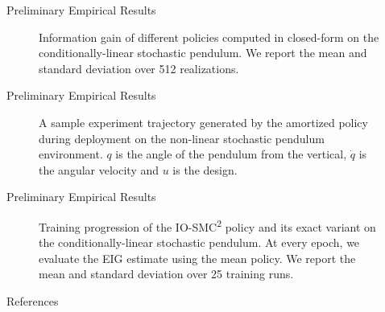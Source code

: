 \documentclass[10pt, aspectratio=1610]{beamer}
\begin{document}
    \begin{frame}{Preliminary Empirical Results}
      \begin{figure}[t]
        
        \vspace{-0.25cm}
        \caption{Information gain of different policies computed in closed-form on the conditionally-linear stochastic pendulum. We report the mean and standard deviation over 512 realizations.}
        \label{fig:pendulum_info_gain}
      \end{figure}
    \end{frame}

    \begin{frame}{Preliminary Empirical Results}
      \begin{figure}[!h]
        \centering
        
        \vspace{-0.25cm}
        \caption{A sample experiment trajectory generated by the amortized policy during deployment on the non-linear stochastic pendulum environment. $q$ is the angle of the pendulum from the vertical, $\dot{q}$ is the angular velocity and $u$ is the design.}
      \end{figure}
    \end{frame}

    \begin{frame}{Preliminary Empirical Results}
      \begin{figure}[t]
        
        \caption{Training progression of the IO-SMC\textsuperscript{2} policy and its exact variant on the conditionally-linear stochastic pendulum. At every epoch, we evaluate the EIG estimate using the mean policy. We report the mean and standard deviation over 25 training runs.}
      \end{figure}
    \end{frame}

  \begin{frame}[t, allowframebreaks]{References}
    
  \end{frame}

  \appendix
\end{document}
